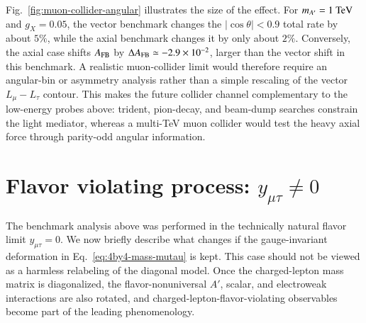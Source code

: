 \documentclass[onecolumn, aps, nofootinbib, prd, preprint, floats, floatfix, amsmath, amssymb, superscriptaddress, preprintnumbers]{revtex4-1}
\begin{document}
Fig.~\ref{fig:muon-collider-angular} illustrates the size of the effect. For \(m_{A'}=1~{\rm TeV}\) and \(g_X=0.05\), the vector benchmark changes the \(|\cos\theta|<0.9\) total rate by about \(5\%\), while the axial benchmark changes it by only about \(2\%\). Conversely, the axial case shifts \(A_{\rm FB}\) by \(\Delta A_{\rm FB}\simeq-2.9\times10^{-2}\), larger than the vector shift in this benchmark. A realistic muon-collider limit would therefore require an angular-bin or asymmetry analysis rather than a simple rescaling of the vector \(L_\mu-L_\tau\) contour. This makes the future collider channel complementary to the low-energy probes above: trident, pion-decay, and beam-dump searches constrain the light mediator, whereas a multi-TeV muon collider would test the heavy axial force through parity-odd angular information.


\section{Flavor violating process: $y_{\mu\tau}\neq 0$}
\label{sec:ymutau-nonzero}

The benchmark analysis above was performed in the technically natural flavor limit \(y_{\mu\tau}=0\). We now briefly describe what changes if the gauge-invariant deformation in Eq.~\eqref{eq:4by4-mass-mutau} is kept. This case should not be viewed as a harmless relabeling of the diagonal model. Once the charged-lepton mass matrix is diagonalized, the flavor-nonuniversal \(A'\), scalar, and electroweak interactions are also rotated, and charged-lepton-flavor-violating observables become part of the leading phenomenology.
\end{document}
